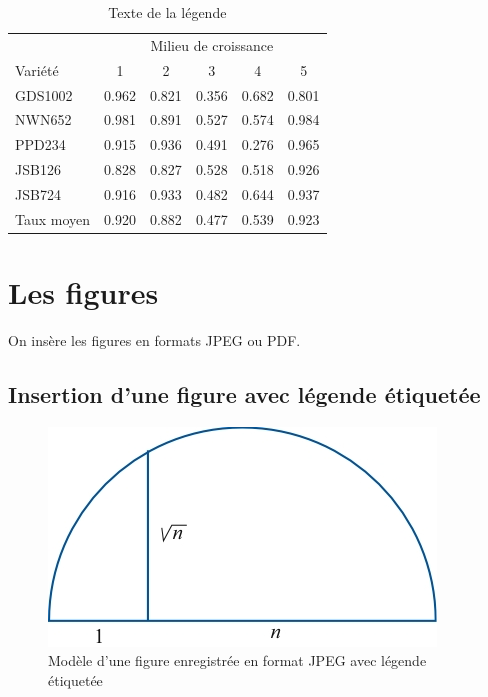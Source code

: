 \documentclass[10pt]{article}
\begin{document}
\begin{table}
\centering
\begin{tabular}{lccccc}
\toprule
& \multicolumn{5}{c}{Milieu de croissance} \\
\cmidrule(l){2-6}
Variété & 1 & 2 & 3 & 4 & 5\\
\midrule
GDS1002 & 0.962 & 0.821 & 0.356 & 0.682 & 0.801\\   %
NWN652 & 0.981 & 0.891 & 0.527 & 0.574 & 0.984\\      %
PPD234 & 0.915 & 0.936 & 0.491 & 0.276 & 0.965\\        %
JSB126 & 0.828 & 0.827 & 0.528 & 0.518 & 0.926\\        %
JSB724 & 0.916 & 0.933 & 0.482 & 0.644 & 0.937\\        %
\midrule
\midrule
Taux moyen & 0.920 & 0.882 & 0.477 & 0.539 & 0.923\\
\bottomrule
\end{tabular}
\caption{Texte de la légende}
\label{tab:template}
\end{table}

\hypertarget{les-figures}{%
\section{\texorpdfstring{Les figures
\label{fig}}{Les figures }}\label{les-figures}}

On insère les figures en formats JPEG ou PDF.

\hypertarget{insertion-dune-figure-avec-legende-etiquetee}{%
\subsection{\texorpdfstring{Insertion d'une figure avec légende
étiquetée
\label{fig+eti}}{Insertion d'une figure avec légende étiquetée }}\label{insertion-dune-figure-avec-legende-etiquetee}}

\begin{figure}[ht]
\centerline{\includegraphics[scale=.8]{pics/Figure1}} \caption{ \label{Modele figure1} Modèle d'une figure enregistrée en format JPEG avec légende étiquetée }
\end{figure}
\end{document}
